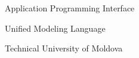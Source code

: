 \begin{utmabbreviations}
\item[API] Application Programming Interface
\item[UML] Unified Modeling Language
\item[UTM] Technical University of Moldova
\end{utmabbreviations}
